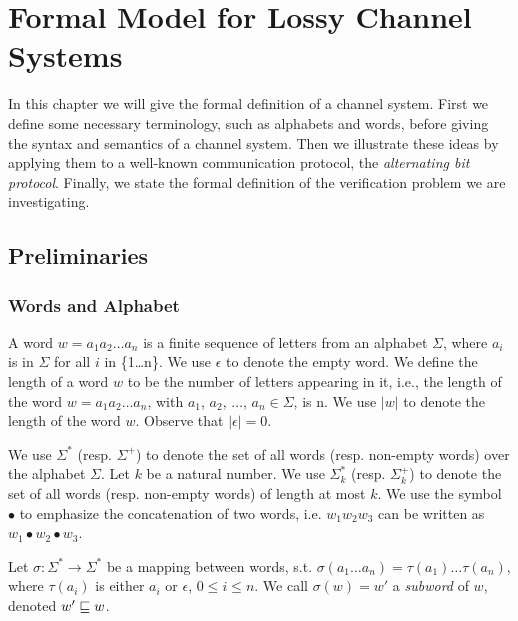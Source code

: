 \section{Formal Model for Lossy Channel Systems}
\label{definitions}
In this chapter we will give the formal definition of a channel system. First we define some necessary terminology, such as alphabets and words, before giving the syntax and semantics of a channel system. Then we illustrate these ideas by applying them to a well-known communication protocol, the \emph{alternating bit protocol}. Finally, we state the formal definition of the verification problem we are investigating.

\subsection{Preliminaries}
\subsubsection{Words and Alphabet}
\label{words}
A word  $w = a_1a_2\ldots a_n$ is a finite sequence of letters from an alphabet $\Sigma$, where $a_i$ is in $\Sigma$ for all $i$ in \{1\ldots n\}. We use $\epsilon$  to denote the empty word. We define the length  of a word $w$ to be the number of letters appearing in it, i.e., the length of the word $w=a_1 a_2 \ldots a_n$, with $a_1$, $a_2$, $\ldots$, $a_n \in \Sigma$, is n. We use $|w|$ to denote the length of the word $w$. Observe that $|\epsilon|=0$.

We use $\Sigma^*$  (resp. $\Sigma^+$) to denote the set of all  words (resp. non-empty words) over the alphabet $\Sigma$.  Let $k$ be a natural number.  We use $\Sigma_k^*$  (resp. $\Sigma_k^+$) to denote the set of all  words (resp. non-empty words)  of length at most $k$. We use the symbol $\bullet$ to emphasize the concatenation of two words, i.e. $w_1w_2w_3$ can be written as $w_1 \bullet w_2 \bullet w_3$.


Let $\sigma : \Sigma^* \rightarrow \Sigma^*$ be a mapping between words, s.t. $\sigma(a_1\ldots a_n) = \tau(a_1)\ldots \tau(a_n)$, where $\tau(a_i)$ is either $a_i$ or $\epsilon$, $0 \leq i \leq n$. We call $\sigma(w) = w'$ a \emph{subword} of $w$, denoted $w' \sqsubseteq w$.

